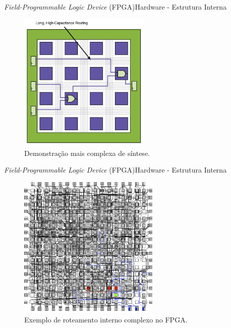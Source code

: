     	\begin{frame}{\textit{Field-Programmable Logic Device} (FPGA)}{Hardware - Estrutura Interna} 
            \vspace{-0.8em}
    		\begin{figure}[H]
    			\centering
    			\includegraphics[width=0.56\textwidth]{img/fpga/exemploInicial.png}
                \vspace{-0.5em}
    			\caption{Demonstração mais complexa de síntese.}
    		\end{figure}
    	\end{frame}
    
    	\begin{frame}{\textit{Field-Programmable Logic Device} (FPGA)}{Hardware - Estrutura Interna}
            \vspace{-1em}
    		\begin{figure}[h]
    			\centering
    			\includegraphics[width=0.6\textwidth]{img/fpga/exemploFinal.png}
                \vspace{-1em}
    			\caption{Exemplo de roteamento interno complexo no FPGA.}
    			\label{fig:exemploFinal}
    		\end{figure}
    	\end{frame}
    
